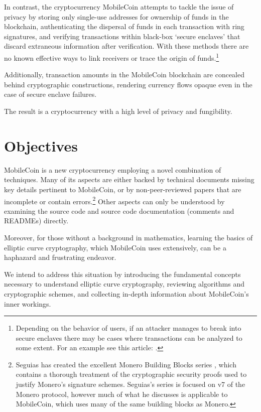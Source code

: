 In contrast, the cryptocurrency MobileCoin attempts to tackle the issue of privacy by storing only single-use addresses for ownership of funds in the blockchain, authenticating the dispersal of funds in each transaction with ring signatures, and verifying transactions within black-box `secure enclaves' that discard extraneous information after verification. With these methods there are no known effective ways to link receivers or trace the origin of funds.\footnote{Depending on the behavior of users, if an attacker manages to break into secure enclaves there may be cases where transactions can be analyzed to some extent. For an example see this article: \cite{monero-ring-heuristics-ryo}.}

Additionally, transaction amounts in the MobileCoin blockchain are concealed behind cryptographic constructions, rendering currency flows opaque even in the case of secure enclave failures.

The result is a cryptocurrency with a high level of privacy and fungibility.



\section{Objectives}
\label{sec:goals}

MobileCoin is a new cryptocurrency employing a novel combination of techniques. Many of its aspects are either backed by technical documents missing key details pertinent to MobileCoin, or by non-peer-reviewed papers that are incomplete or contain errors.\footnote{Seguias has created the excellent Monero Building Blocks series \cite{monero-building-blocks}, which contains a thorough treatment of the cryptographic security proofs used to justify Monero's signature schemes. Seguias's series is focused on v7 of the Monero protocol, however much of what he discusses is applicable to MobileCoin, which uses many of the same building blocks as Monero.} Other aspects can only be understood by examining the source code and source code documentation (comments and READMEs) directly.

Moreover, for those without a background in mathematics, learning the basics of elliptic curve cryptography, which MobileCoin uses extensively, can be a haphazard and frustrating endeavor.

We intend to address this situation by introducing the fundamental concepts necessary to understand elliptic curve cryptography, reviewing algorithms and cryptographic schemes, and collecting in-depth information about MobileCoin’s inner workings.

